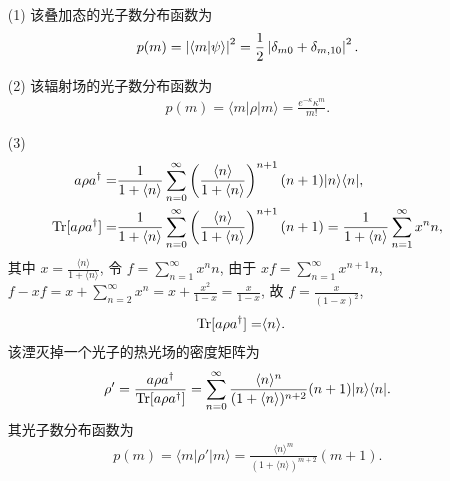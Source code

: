 \documentclass{assignment}
\begin{document}
\begin{sol}
    \begin{itemize}
        \item[(1)] 该叠加态的光子数分布函数为
        \begin{align}
            p(m)=\left\lvert\langle m\vert\psi\rangle\right\rvert^2=\frac{1}{2}\left\lvert\delta_{m0}+\delta_{m,10}\right\rvert^2.
        \end{align}
        \item[(2)] 该辐射场的光子数分布函数为
        \begin{align}
            p(m)=\langle m\rvert\rho\lvert m\rangle=\frac{e^{-\kappa}\kappa^m}{m!}.
        \end{align}
        \item[(3)] 
        \begin{align}
            a\rho a^{\dagger}=&\frac{1}{1+\langle n\rangle}\sum_{n=0}^{\infty}\left(\frac{\langle n\rangle}{1+\langle n\rangle}\right)^{n+1}(n+1)\lvert n\rangle\langle n\rvert,\\
            \notag\operatorname{Tr}[a\rho a^{\dagger}]=&\frac{1}{1+\langle n\rangle}\sum_{n=0}^{\infty}\left(\frac{\langle n\rangle}{1+\langle n\rangle}\right)^{n+1}(n+1)=\frac{1}{1+\langle n\rangle}\sum_{n=1}^{\infty}x^nn,
        \end{align}
        其中 $x=\frac{\langle n\rangle}{1+\langle n\rangle}$, 令 $f=\sum_{n=1}^{\infty}x^nn$, 由于 $xf=\sum_{n=1}^{\infty}x^{n+1}n$, $f-xf=x+\sum_{n=2}^{\infty}x^n=x+\frac{x^2}{1-x}=\frac{x}{1-x}$, 故 $f=\frac{x}{(1-x)^2}$,
        \begin{align}
            \operatorname{Tr}[a\rho a^{\dagger}]=&\langle n\rangle.
        \end{align}
        该湮灭掉一个光子的热光场的密度矩阵为
        \begin{align}
            \rho'=\frac{a\rho a^{\dagger}}{\operatorname{Tr}[a\rho a^{\dagger}]}=\sum_{n=0}^{\infty}\frac{\langle n\rangle^n}{(1+\langle n\rangle)^{n+2}}(n+1)\lvert n\rangle\langle n\rvert.
        \end{align}
        其光子数分布函数为
        \begin{align}
            p(m)=\langle m\rvert\rho'\lvert m\rangle=\frac{\langle n\rangle^m}{(1+\langle n\rangle)^{m+2}}(m+1).
        \end{align}
    \end{itemize}
\end{sol}
\end{document}
